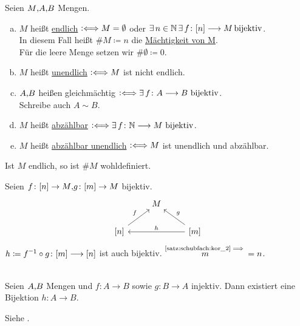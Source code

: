 \documentclass[../ana1.tex]{subfiles}
\begin{document}
\begin{defi}
	Seien \(M \text{,} A \text{,} B \) Mengen.
	\begin{enumerate}[(a)]
		\item \(M \) heißt \underline{endlich} \(\mathrel{\vcentcolon\Longleftrightarrow} M = \emptyset \) oder \(\exists \, n \in \mathbb{N} \, \exists \, f \colon [n] \longrightarrow M \operatorname{bijektiv} \). \\
			  In diesem Fall heißt \(\#M \coloneqq n \) die \underline{Mächtigkeit von M}. \\
			  Für die leere Menge setzen wir \(\#\emptyset \coloneqq 0 \). \\
		\item \(M \) heißt \underline{unendlich} \(\mathrel{\vcentcolon\Longleftrightarrow} M \) ist nicht endlich.
		\item \(A \text{,} B \) heißen gleichmächtig \(\mathrel{\vcentcolon\Longleftrightarrow} \exists \, f \colon A \longrightarrow B \, \operatorname{bijektiv} \). \\
			  Schreibe auch \(A \sim B\).
		\item \(M \) heißt \underline{abzählbar} \(\mathrel{\vcentcolon\Longleftrightarrow} \exists \, f \colon \mathbb{N} \longrightarrow M \, \operatorname{bijektiv} \).
		\item \(M \) heißt \underline{abzählbar unendlich} \(\mathrel{\vcentcolon\Longleftrightarrow} M \) ist unendlich und abzählbar.
	\end{enumerate}
\end{defi}

\begin{bem}
	Ist \(M \) endlich, so ist \(\#M \) wohldefiniert.
\end{bem}
\begin{bew}
	Seien \(f \colon [n] \rightarrow M \text{,} g \colon [m] \rightarrow M \) bijektiv.
	\[\begin{tikzcd}
		& M &  \\
	   {[n]} \arrow[ru, "f"] &  & {[m]} \arrow[lu, "g"'] \arrow[ll, "h"']
	\end{tikzcd}\]
	\( h \coloneqq \inverse{f} \circ g \colon [m] \longrightarrow [n] \) ist auch bijektiv. \(\overset{\text{\autoref{satz:schubfach:kor_2}}{\implies}} m=n \).
\end{bew}

\iftoggle{short}{}{\newpage}%

\begin{bem}\label{satz:cantor_Berenstein}\leavevmode \\
	Seien \(A \text{,} B \) Mengen und \(f \colon A \longrightarrow B \) sowie \(g \colon B \longrightarrow A \) injektiv.
	Dann existiert eine Bijektion \(h \colon A \longrightarrow B \).
\end{bem}
\begin{bew}
	Siehe \cite[Kolmogorov-Fomin: Introductory Real Analysis]{Kolmogorov}.
\end{bew}
\end{document}
